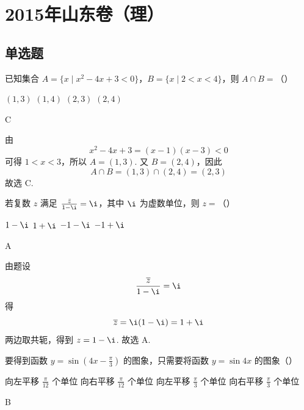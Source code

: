 \chapter{2015年山东卷（理）}

\section{单选题}

\begin{problem}
已知集合 \(A = \{x \mid x^2 - 4x + 3 < 0\}\)，\(B = \{x \mid 2 < x < 4\}\)，则 \(A \cap B =\)（\quad）

\choices
    {\((1,3)\)}
    {\((1,4)\)}
    {\((2,3)\)}
    {\((2,4)\)}
\end{problem}

\begin{answer}
C
\end{answer}

\begin{solution}
由
\[
x^2-4x+3=(x-1)(x-3)<0
\]
可得 \(1<x<3\)，所以 \(A=(1,3)\). 又 \(B=(2,4)\)，因此
\[
A\cap B=(1,3)\cap(2,4)=(2,3)
\]
故选 C.
\end{solution}

\begin{problem}
若复数 \(z\) 满足 \(\frac{\bar z}{1 - \i} = \i\)，其中 \(\i\) 为虚数单位，则 \(z =\)（\quad）

\choices
    {\(1 - \i\)}
    {\(1 + \i\)}
    {\(-1 - \i\)}
    {\(-1 + \i\)}
\end{problem}

\begin{answer}
A
\end{answer}

\begin{solution}
由题设
\[
\frac{\overline z}{1-\i}=\i
\]
得
\[
\overline z=\i(1-\i)=1+\i
\]
两边取共轭，得到 \(z=1-\i\). 故选 A.
\end{solution}

\begin{problem}
要得到函数 \(y = \sin\left(4x - \frac{\pi}{3}\right)\) 的图象，只需要将函数 \(y = \sin 4x\) 的图象（\quad）

\choices
    {向左平移 \(\frac{\pi}{12}\) 个单位}
    {向右平移 \(\frac{\pi}{12}\) 个单位}
    {向左平移 \(\frac{\pi}{3}\) 个单位}
    {向右平移 \(\frac{\pi}{3}\) 个单位}
\end{problem}

\begin{answer}
B
\end{answer}

